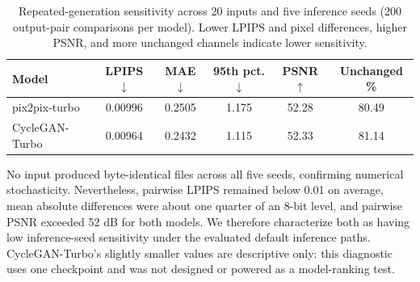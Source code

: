 \documentclass{article}
\begin{document}
\begin{table}[h]
  \caption{Repeated-generation sensitivity across 20 inputs and five inference seeds (200 output-pair comparisons per model). Lower LPIPS and pixel differences, higher PSNR, and more unchanged channels indicate lower sensitivity.}
  \centering
  \scriptsize
  \setlength{\tabcolsep}{4pt}
  \begin{tabular}{lccccc}
    \toprule
    Model & LPIPS $\downarrow$ & MAE $\downarrow$ & 95th pct. $\downarrow$ & PSNR $\uparrow$ & Unchanged \%
    \\
    \midrule
    pix2pix-turbo & 0.00996 & 0.2505 & 1.175 & 52.28 & 80.49 \\
    CycleGAN-Turbo & 0.00964 & 0.2432 & 1.115 & 52.33 & 81.14 \\
    \bottomrule
  \end{tabular}
\end{table}

No input produced byte-identical files across all five seeds, confirming numerical stochasticity. Nevertheless, pairwise LPIPS remained below 0.01 on average, mean absolute differences were about one quarter of an 8-bit level, and pairwise PSNR exceeded 52 dB for both models. We therefore characterize both as having low inference-seed sensitivity under the evaluated default inference paths. CycleGAN-Turbo's slightly smaller values are descriptive only: this diagnostic uses one checkpoint and was not designed or powered as a model-ranking test.
\end{document}
